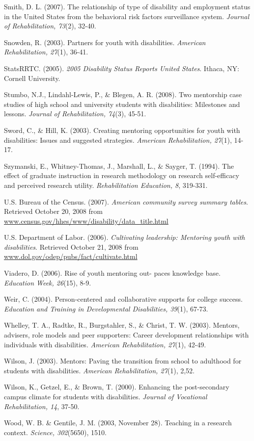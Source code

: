 \documentclass[11.5pt]{sig-alternate} %
\begin{document}
Smith, D. L. (2007). The relationship of type of disability and employment status in the United States from the behavioral risk factors surveillance system. \textit{Journal of Rehabilitation, 73}(2), 32-40.

Snowden, R. (2003). Partners for youth with disabilities. \textit{American Rehabilitation, 27}(1), 36-41.

StatsRRTC. (2005). \textit{2005 Disability Status Reports United States}. Ithaca, NY: Cornell University.

Stumbo, N.J., Lindahl-Lewis, P., \& Blegen, A. R. (2008). Two mentorship case studies of high school and university students with disabilities: Milestones and lessons. \textit{Journal of Rehabilitation, 74}(3), 45-51.

Sword, C., \& Hill, K. (2003). Creating mentoring opportunities for youth with disabilities: Issues and suggested strategies.\textit{ American Rehabilitation, 27}(1), 14-17.

Szymanski, E., Whitney-Thomas, J., Marshall, L., \& Sayger, T. (1994). The effect of graduate instruction in research methodology on research self-efficacy and perceived research utility. \textit{Rehabilitation Education, 8}, 319-331.

U.S. Bureau of the Census. (2007).\textit{ American community survey summary tables}. Retrieved October 20, 2008 from \url{www.census.gov/hhes/www/disability/data_title.html}

U.S. Department of Labor. (2006). \textit{Cultivating leadership: Mentoring youth with disabilities}. Retrieved October 21, 2008 from \url{www.dol.gov/odep/pubs/fact/cultivate.html}

Viadero, D. (2006). Rise of youth mentoring out- paces knowledge base.\textit{ Education Week, 26}(15), 8-9.

Weir, C. (2004). Person-centered and collaborative supports for college success. \textit{Education and Training in Developmental Disabilities, 39}(1), 67-73.

Whelley, T. A., Radtke, R., Burgstahler, S., \& Christ, T. W. (2003). Mentors, advisers, role models and peer supporters: Career development relationships with individuals with disabilities. \textit{American Rehabilitation, 27}(1), 42-49.

Wilson, J. (2003). Mentors: Paving the transition from school to adulthood for students with disabilities. \textit{American Rehabilitation, 27}(1), 2,52.

Wilson, K., Getzel, E., \& Brown, T. (2000). Enhancing the post-secondary campus climate for students with disabilities.\textit{ Journal of Vocational Rehabilitation, 14}, 37-50.

Wood, W. B. \& Gentile, J. M. (2003, November 28). Teaching in a research context.\textit{ Science, 302}(5650), 1510.
\end{document}
